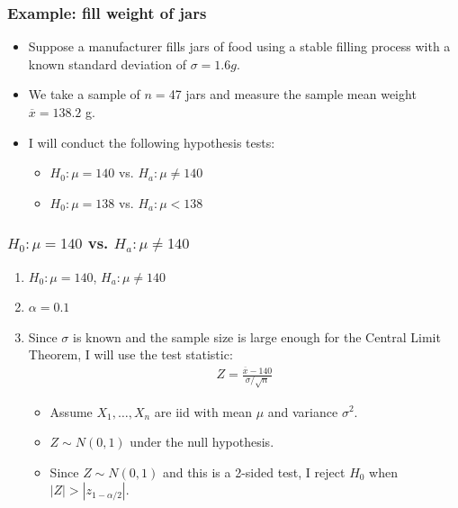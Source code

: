 \documentclass[handout]{beamer}\usepackage[]{graphicx}\usepackage[]{color}
\providecommand{\ov}[1]{\overline{#1}}
\numberwithin{equation}{section}
\begin{document}
\begin{frame}
\frametitle{Example: fill weight of jars} \small
\begin{itemize}
\pause \item Suppose a manufacturer fills jars of food using a stable filling process with a known standard deviation of $\sigma = 1.6 g$. 
\pause \item We take a sample of $n = $47 jars and measure the sample mean weight $\ov{x} = 138.2$ g.
\pause \item I will conduct the following hypothesis tests:
\begin{itemize}
\pause \item $H_0: \mu = 140$ vs. $H_a: \mu \ne 140$
\pause \item $H_0: \mu = 138$ vs. $H_a: \mu < 138$
\end{itemize}
\end{itemize}
\end{frame}

\begin{frame}
\frametitle{ $H_0: \mu = 140$ vs. $H_a: \mu \ne 140$} \small

\begin{enumerate}[1. ]
\item  $H_0: \mu = 140$, $H_a: \mu \ne 140$
\pause \item $\alpha = 0.1$
\pause \item Since $\sigma$ is known and the sample size is large enough for the Central Limit Theorem, I will use the test statistic:
\begin{align*}
Z = \frac{\ov{x} - 140}{\sigma/\sqrt{n}}
\end{align*}
\begin{itemize}
\pause \item Assume $X_1, \ldots, X_n$ are iid with mean $\mu$ and variance $\sigma^2$.
\pause \item $Z \sim N(0,1)$ under the null hypothesis.
\pause \item Since $Z \sim N(0,1)$ and this is a 2-sided test, I reject $H_0$ when $|Z| > |z_{1 - \alpha/2}|$.
\end{itemize}

\end{enumerate}
\end{frame}
\end{document}
